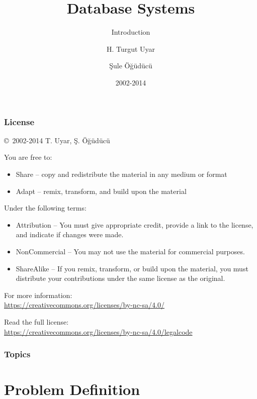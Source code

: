 \documentclass[dvipsnames]{beamer}
\title{Database Systems}
\subtitle{Introduction}
\author{H. Turgut Uyar \and Şule Öğüdücü}
\date{2002-2014}
\theoremstyle{plain}
\begin{document}
\begin{frame}
  \titlepage
\end{frame}

\begin{frame}
  \frametitle{License}

  \hfill
  \copyright~2002-2014 T. Uyar, Ş. Öğüdücü

  \vfill
  \begin{footnotesize}
    You are free to:
    \begin{itemize}
      \itemsep0em
      \item Share -- copy and redistribute the material in any medium or format
      \item Adapt -- remix, transform, and build upon the material
    \end{itemize}

    Under the following terms:
    \begin{itemize}
      \itemsep0em
      \item Attribution -- You must give appropriate credit, provide a link to
        the license, and indicate if changes were made.

      \item NonCommercial -- You may not use the material for commercial
        purposes.

      \item ShareAlike -- If you remix, transform, or build upon the material,
        you must distribute your contributions under the same license as the
        original.
    \end{itemize}
  \end{footnotesize}

  \begin{small}
    For more information:\\
    \url{https://creativecommons.org/licenses/by-nc-sa/4.0/}

    \smallskip
    Read the full license:\\
    \url{https://creativecommons.org/licenses/by-nc-sa/4.0/legalcode}
  \end{small}
\end{frame}

\begin{frame}
  \frametitle{Topics}
  \tableofcontents
\end{frame}

\section{Problem Definition}
\end{document}
